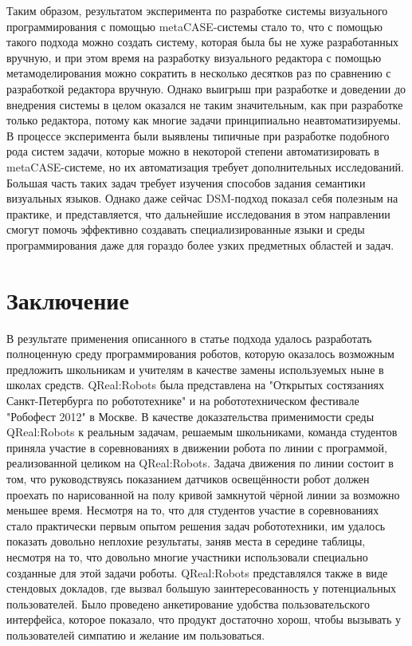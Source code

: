 \documentclass[a4paper]{article}
\begin{document}
Таким образом, результатом эксперимента по разработке системы визуального программирования с помощью metaCASE-системы стало то, что с помощью такого подхода можно создать систему, которая была бы не хуже разработанных вручную, и при этом время на разработку визуального редактора с помощью метамоделирования можно сократить в несколько десятков раз по сравнению с разработкой редактора вручную. Однако выигрыш при разработке и доведении до внедрения системы в целом оказался не таким значительным, как при разработке только редактора, потому как многие задачи принципиально неавтоматизируемы. В процессе эксперимента были выявлены типичные при разработке подобного рода систем задачи, которые можно в некоторой степени автоматизировать в metaCASE-системе, но их автоматизация требует дополнительных исследований. Большая часть таких задач требует изучения способов задания семантики визуальных языков. Однако даже сейчас DSM-подход показал себя полезным на практике, и представляется, что дальнейшие исследования в этом направлении смогут помочь эффективно создавать специализированные языки и среды программирования даже для гораздо более узких предметных областей и задач.

\section*{Заключение}
В результате применения описанного в статье подхода удалось разработать полноценную среду программирования роботов, которую оказалось возможным предложить школьникам и учителям в качестве замены используемых ныне в школах средств. QReal:Robots была представлена на "Открытых состязаниях Санкт-Петербурга по робототехнике" и на робототехническом фестивале "Робофест 2012" в Москве. В качестве доказательства применимости среды QReal:Robots к реальным задачам, решаемым школьниками, команда студентов приняла участие в соревнованиях в движении робота по линии с программой, реализованной целиком на QReal:Robots. Задача движения по линии состоит в том, что руководствуясь показанием датчиков освещённости робот должен проехать по нарисованной на полу кривой замкнутой чёрной линии за возможно меньшее время. Несмотря на то, что для студентов участие в соревнованиях стало практически первым опытом решения задач робототехники, им удалось показать довольно неплохие результаты, заняв места в середине таблицы, несмотря на то, что довольно многие участники использовали специально созданные для этой задачи роботы. QReal:Robots представлялся также в виде стендовых докладов, где вызвал большую заинтересованность у потенциальных пользователей. Было проведено анкетирование удобства пользовательского интерфейса, которое показало, что продукт достаточно хорош, чтобы вызывать у пользователей симпатию и желание им пользоваться.
\end{document}
